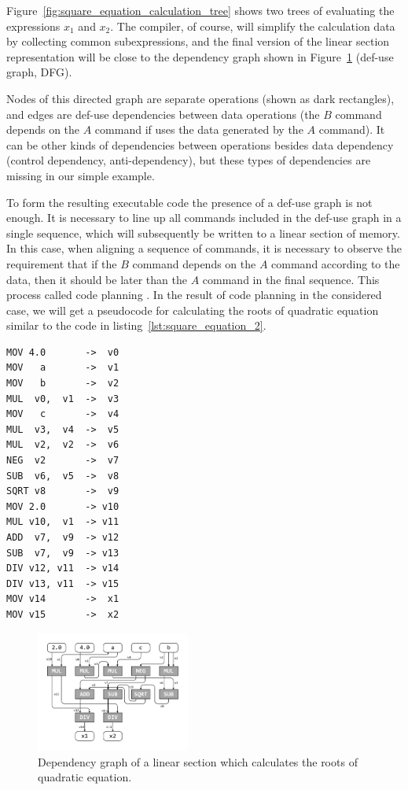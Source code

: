 \documentclass[
11pt,%
tightenlines,%
twoside,%
onecolumn,%
nofloats,%
nobibnotes,%
nofootinbib,%
superscriptaddress,%
noshowpacs,%
centertags]%
{revtex4}
\begin{document}
Figure~\ref{fig:square_equation_calculation_tree} shows two trees of evaluating the expressions $x_1$ and $x_2$.
The compiler, of course, will simplify the calculation data by collecting common subexpressions, and the final version of the linear section representation will be close to the dependency graph shown in Figure~\ref{fig:def_use} (def-use graph, DFG).

Nodes of this directed graph are separate operations (shown as dark rectangles), and edges are def-use dependencies between data operations (the $B$ command depends on the $A$ command if uses the data generated by the $A$ command).
It can be other kinds of dependencies between operations besides data dependency (control dependency, anti-dependency), but these types of dependencies are missing in our simple example.

To form the resulting executable code the presence of a def-use graph is not enough.
It is necessary to line up all commands included in the def-use graph in a single sequence, which will subsequently be written to a linear section of memory.
In this case, when aligning a sequence of commands, it is necessary to observe the requirement that if the $B$ command depends on the $A$ command according to the data, then it should be later than the $A$ command in the final sequence.
This process called code planning \cite{Aho}.
In the result of code planning in the considered case, we will get a pseudocode for calculating the roots of quadratic equation similar to the code in listing~\ref{lst:square_equation_2}.



\begin{lstlisting}[caption={Pseudocode for calculating the roots of  quadratic equation.},label={lst:square_equation_2}]
MOV 4.0       ->  v0
MOV   a       ->  v1
MOV   b       ->  v2
MUL  v0,  v1  ->  v3
MOV   c       ->  v4
MUL  v3,  v4  ->  v5
MUL  v2,  v2  ->  v6
NEG  v2       ->  v7
SUB  v6,  v5  ->  v8
SQRT v8       ->  v9
MOV 2.0       -> v10
MUL v10,  v1  -> v11
ADD  v7,  v9  -> v12
SUB  v7,  v9  -> v13
DIV v12, v11  -> v14
DIV v13, v11  -> v15
MOV v14       ->  x1
MOV v15       ->  x2
\end{lstlisting}

\begin{figure}[h]
\includegraphics[width=0.45\textwidth]{pics/def_use.pdf}
\caption{Dependency graph of a linear section which calculates the roots of quadratic equation.}\label{fig:def_use}
\end{figure}
\end{document}
